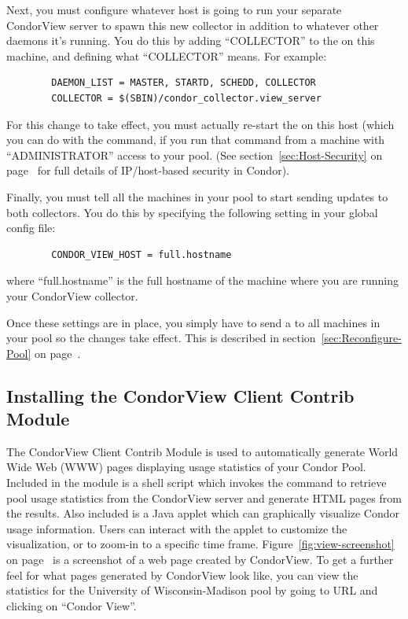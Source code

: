 Next, you must configure whatever host is going to run your separate
CondorView server to spawn this new collector in addition to whatever
other daemons it's running.
You do this by adding ``COLLECTOR'' to the  on
this machine, and defining what ``COLLECTOR'' means.
For example:
\begin{verbatim}
        DAEMON_LIST = MASTER, STARTD, SCHEDD, COLLECTOR
        COLLECTOR = $(SBIN)/condor_collector.view_server
\end{verbatim}
For this change to take effect, you must actually re-start the
 on this host (which you can do with the
 command, if you run that command from a machine with 
``ADMINISTRATOR'' access to your pool.
(See section~\ref{sec:Host-Security} on
page~\pageref{sec:Host-Security} for full details of IP/host-based
security in Condor).

Finally, you must tell all the machines in your pool to start sending
updates to both collectors.
You do this by specifying the following setting in your global config
file:
\begin{verbatim}
        CONDOR_VIEW_HOST = full.hostname
\end{verbatim}
where ``full.hostname'' is the full hostname of the machine where you
are running your CondorView collector.

Once these settings are in place, you simply have to send a
 to all machines in your pool so the changes take
effect.
This is described in section~\ref{sec:Reconfigure-Pool} on
page~\pageref{sec:Reconfigure-Pool}.

\subsection{\label{sec:CondorView-Client-Install}
Installing the CondorView Client Contrib Module} 

\newcommand{\MakeStats}{\Prog{make\_stats}}

The CondorView Client Contrib Module is used to automatically generate
World Wide Web (WWW) pages displaying usage statistics of your Condor
Pool.
Included in the module is a shell script which invokes the 
command to retrieve pool usage statistics from the CondorView server and
generate HTML pages from the results.  
Also included is a Java applet which can graphically visualize Condor 
usage information.  
Users can interact with the applet to customize the visualization, or to
zoom-in to a specific time frame.
Figure~\ref{fig:view-screenshot} on page~\pageref{fig:view-screenshot}
is a screenshot of a web page created by CondorView.  
To get a further feel for what pages generated by CondorView look like,
you can view the statistics for the University of Wisconsin-Madison pool
by going to URL  and clicking on
``Condor View''.

